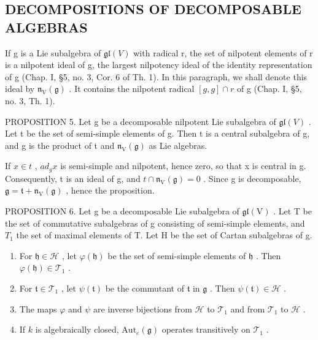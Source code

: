 \subsection{DECOMPOSITIONS OF DECOMPOSABLE ALGEBRAS}

If g is a Lie subalgebra of \(\mathfrak{gl}(V)\) with radical r, the set of nilpotent elements of r is a nilpotent ideal of g, the largest nilpotency ideal of the identity representation of g (Chap. I, §5, no. 3, Cor. 6 of Th. 1). In this paragraph, we shall denote this ideal by \(\mathfrak{n}_{\mathrm{V}}(\mathfrak{g})\) . It contains the nilpotent radical \([g,g]\cap r\) of g (Chap. I, §5, no. 3, Th. 1).

PROPOSITION 5. Let g be a decomposable nilpotent Lie subalgebra of \(\mathfrak{gl}(V)\) . Let t be the set of semi-simple elements of g. Then t is a central subalgebra of g, and g is the product of t and \(\mathfrak{n}_{\mathrm{V}}(\mathfrak{g})\) as Lie algebras.

If \(x \in t\) , \(ad_{g}x\) is semi-simple and nilpotent, hence zero, so that x is central in g. Consequently, t is an ideal of g, and \(t \cap \mathfrak{n}_{\mathrm{V}}(\mathfrak{g}) = 0\) . Since g is decomposable, \(\mathfrak{g} = \mathfrak{t} + \mathfrak{n}_{\mathrm{V}}(\mathfrak{g})\) , hence the proposition.

PROPOSITION 6. Let g be a decomposable Lie subalgebra of \(\mathfrak{gl}(\mathrm{V})\) . Let T be the set of commutative subalgebras of g consisting of semi-simple elements, and \(T_{1}\) the set of maximal elements of T. Let H be the set of Cartan subalgebras of g.

\begin{enumerate}
\def\labelenumi{(\roman{enumi})}
\item
  For \(\mathfrak{h} \in \mathcal{H}\) , let \(\varphi(\mathfrak{h})\) be the set of semi-simple elements of \(\mathfrak{h}\) . Then \(\varphi(\mathfrak{h}) \in \mathcal{T}_1\) .
\item
  For \(\mathfrak{t} \in \mathcal{T}_1\) , let \(\psi(\mathfrak{t})\) be the commutant of \(\mathfrak{t}\) in \(\mathfrak{g}\) . Then \(\psi(\mathfrak{t}) \in \mathscr{H}\) .
\item
  The maps \(\varphi\) and \(\psi\) are inverse bijections from \(\mathcal{H}\) to \(\mathcal{T}_1\) and from \(\mathcal{T}_1\) to \(\mathcal{H}\) .
\item
  If \(k\) is algebraically closed, \(\mathrm{Aut}_e(\mathfrak{g})\) operates transitively on \(\mathcal{T}_1\) .
\end{enumerate}


